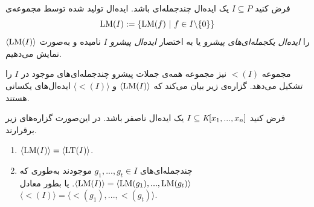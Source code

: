 \begin{definition}
فرض کنید 
$I\subseteq P$
یک ایده‌ال چندجمله‌ای باشد. ایده‌ال تولید شده توسط مجموعه‌ی 
$$\operatorname{\mathrm{LM}}(I):=\{\operatorname{\mathrm{LM}}(f) \ | \ f\in I\backslash\{0\}\}$$
را 
\textit{ایده‌ال یکجمله‌ای‌های پیشرو}
یا به اختصار 
\textit{ایده‌ال پیشرو}
$I$
نامیده و به‌صورت 
$\langle \operatorname{\mathrm{LM}}(I)\rangle$
نمایش می‌دهیم.
\end{definition}
مجموعه‌ 
$\lt(I)$
نیز مجموعه‌  همه‌ی جملات پیشرو چندجمله‌ای‌های موجود در 
$I$
را تشکیل می‌دهد.  گزاره‌ی زیر بیان می‌کند که 
$\langle\operatorname{\mathrm{LM}}(I)\rangle$
و
$\langle\lt(I)\rangle$
ایده‌ال‌های یکسانی هستند.
\begin{proposition}
	\label{lmeqlt}
فرض کنید 
$I\subseteq\textit{K}[x_{1},...,x_{n}]$
یک ایده‌ال ناصفر باشد. در این‌صورت گزاره‌های زیر برقرارند.
\begin{enumerate}
\item
$\langle \operatorname{\mathrm{LM}}(I)\rangle = \langle\operatorname{\mathrm{LT}}(I)\rangle$.
\item
چندجمله‌ای‌های 
$g_{1},...,g_{t}\in I$
موجودند به‌طوری که 
$\langle\operatorname{\mathrm{LM}}(I)\rangle = \langle\operatorname{\mathrm{LM}}(g_{1}),...,\operatorname{\mathrm{LM}}(g_{t})\rangle$.
یا بطور معادل 
$\langle \lt(I)\rangle = \langle \lt(g_{1}),...,\lt(g_{t})\rangle$.
\end{enumerate}
\end{proposition}

